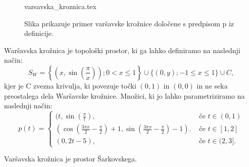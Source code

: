 \documentclass[mat2]{fmfdelo}
\begin{document}
\begin{figure}[h]
  \centering
  {varsavska_kroznica.tex}
  \caption[Varšavska krožnica]{Slika prikazuje primer varšavske krožnice določene s predpisom p iz definicije.}
  \label{fig:varšavski}
\end{figure}


\begin{definicija}
Waršavska krožnica je topološki prostor, ki ga lahko definiramo na naslednji način:
$$S_W = \left\{\left(x, \sin\left(\frac{\pi}{x}\right)\right); 0 < x \leq 1\right\} \cup \{(0, y); -1 \leq x \leq 1\} \cup C,$$
kjer je C zvezna krivulja, ki povezuje točki $(0,1)$ in $(0,0)$ in ne seka preostalega dela Waršavske krožnice.
Množici, ki jo lahko parametriziramo na naslednji način:
\[ p(t) = \begin{cases}
  (t, \sin(\frac{\pi}{t}), & \mbox{ če $t \in (0, 1) $}\\
 (\cos(\frac{3\pi x}{2}-\frac{\pi}{2})+1, \sin(\frac{3\pi x}{2}-\frac{\pi}{2})-1). & \mbox{ če $t \in [1, 2]$}\\
  (0, 2t-5), & \mbox{ če $t \in (2, 3]$.}
  \end{cases}
  \]
\end{definicija}

\begin{trditev}
Varšavska krožnica je prostor Šarkovskega.
\end{trditev}

\end{document}

